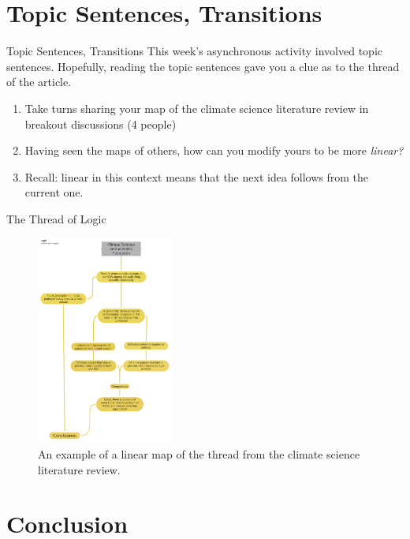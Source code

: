 \documentclass{beamer}
\begin{document}
\section{Topic Sentences, Transitions}

\begin{frame}{Topic Sentences, Transitions}
\alert{This week's asynchronous activity} involved topic sentences.  Hopefully, reading the topic sentences gave you a clue as to the thread of the article. \\ 
\begin{enumerate}
\item Take turns sharing your map of the climate science literature review in breakout discussions (4 people)
\item Having seen the maps of others, how can you modify yours to be more \textit{linear?}
\item Recall: linear in this context means that the next idea follows from the current one.
\end{enumerate}
\end{frame}

\begin{frame}{The Thread of Logic}
\begin{figure}
\centering
\includegraphics[width=0.4\textwidth]{figures/climate2.pdf}
\caption{\label{fig:climate2} An example of a linear map of the thread from the climate science literature review.}
\end{figure}
\end{frame}

\section{Conclusion}
\end{document}
